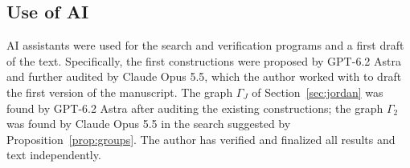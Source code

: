\documentclass[11pt]{amsart}
\theoremstyle{definition}
\begin{document}
\subsection*{Use of AI}
AI assistants were used for the search and verification programs and a first draft of the text. Specifically, the first constructions were proposed by GPT-6.2 Astra and further audited by Claude Opus 5.5, which the author worked with to draft the first version of the manuscript. The graph $\Gamma_J$ of Section~\ref{sec:jordan} was found by GPT-6.2 Astra after auditing the existing constructions; the graph $\Gamma_2$ was found by Claude Opus 5.5 in the search suggested by Proposition~\ref{prop:groups}. The author has verified and finalized all results and text independently.


\end{document}
